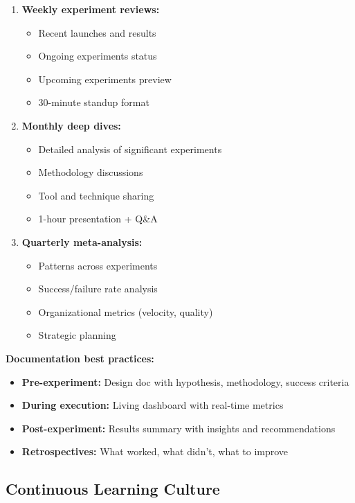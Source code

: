 \begin{enumerate}
    \item \textbf{Weekly experiment reviews:}
    \begin{itemize}
        \item Recent launches and results
        \item Ongoing experiments status
        \item Upcoming experiments preview
        \item 30-minute standup format
    \end{itemize}

    \item \textbf{Monthly deep dives:}
    \begin{itemize}
        \item Detailed analysis of significant experiments
        \item Methodology discussions
        \item Tool and technique sharing
        \item 1-hour presentation + Q\&A
    \end{itemize}

    \item \textbf{Quarterly meta-analysis:}
    \begin{itemize}
        \item Patterns across experiments
        \item Success/failure rate analysis
        \item Organizational metrics (velocity, quality)
        \item Strategic planning
    \end{itemize}
\end{enumerate}

\textbf{Documentation best practices:}

\begin{itemize}
    \item \textbf{Pre-experiment:} Design doc with hypothesis, methodology, success criteria
    \item \textbf{During execution:} Living dashboard with real-time metrics
    \item \textbf{Post-experiment:} Results summary with insights and recommendations
    \item \textbf{Retrospectives:} What worked, what didn't, what to improve
\end{itemize}

\subsection{Continuous Learning Culture}


